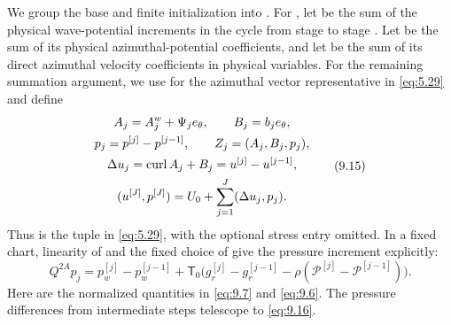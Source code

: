 We group the base and finite initialization into
. For , let
 be the sum of the physical wave-potential increments in the
cycle from stage  to stage . Let
 be the sum of its physical azimuthal-potential coefficients, and let
 be the sum of its direct azimuthal velocity coefficients in physical
variables. For the remaining summation argument, we use  for the
azimuthal vector representative in \eqref{eq:5.29} and define
\begin{equation}
\begin{gathered}
A_j=A_j^w+\Psi_je_\theta,
\qquad B_j=b_je_\theta,\\
p_j=p^{[j]}-p^{[j-1]},
\qquad Z_j=(A_j,B_j,p_j),\\
\Delta u_j=\operatorname{curl} A_j+B_j=u^{[j]}-u^{[j-1]},\\
(u^{[J]},p^{[J]})=U_0+\sum_{j=1}^{J}(\Delta u_j,p_j).
\end{gathered}
\tag{9.15}\label{eq:9.15}
\end{equation}
%
Thus  is the tuple in \eqref{eq:5.29}, with the optional stress entry
omitted. In a fixed  chart, linearity of
 and the fixed choice of  give the
pressure increment explicitly:
\begin{equation}
Q^{2A}p_j=p_w^{[j]}-p_w^{[j-1]}
 +\mathsf T_0\bigl(g_r^{[j]}-g_r^{[j-1]}-\rho(\mathcal P^{[j]}-\mathcal P^{[j-1]})\bigr).
\tag{9.16}\label{eq:9.16}
\end{equation}
Here  are the normalized quantities in
\eqref{eq:9.7} and \eqref{eq:9.6}. The pressure differences from intermediate steps telescope to
\eqref{eq:9.16}.

